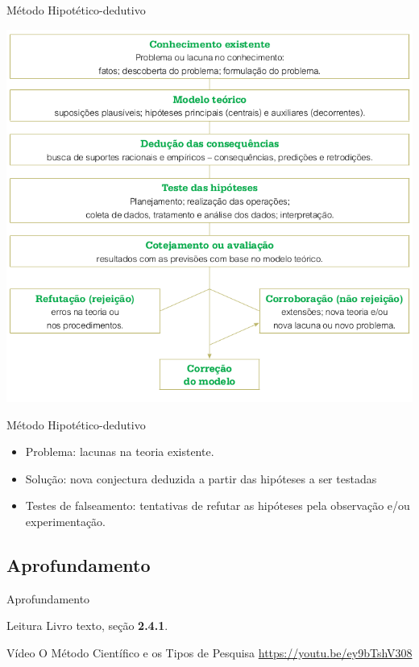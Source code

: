 \documentclass{beamer}
\begin{document}
\begin{frame}{Método Hipotético-dedutivo}
  \begin{center}
    \includegraphics[height=0.95\textheight]{Metodos/metodo_hipotetico}
  \end{center}
\end{frame}

\begin{frame}{Método Hipotético-dedutivo}
  \begin{itemize}
  \item Problema: lacunas na teoria existente.
  \item Solução: nova conjectura deduzida a partir das hipóteses a ser
    testadas
  \item Testes de falseamento: tentativas de refutar as hipóteses pela
    observação e/ou experimentação.
  \end{itemize}
\end{frame}


\subsection{Aprofundamento}

\begin{frame}{Aprofundamento}
  \begin{block}{Leitura}
    Livro texto, seção {\bf 2.4.1}.
  \end{block}
  \begin{block}{Vídeo}
    O Método Científico e os Tipos de Pesquisa \href{https://youtu.be/ey9bTshV308}{https://youtu.be/ey9bTshV308}
  \end{block}

\end{frame}
\end{document}
